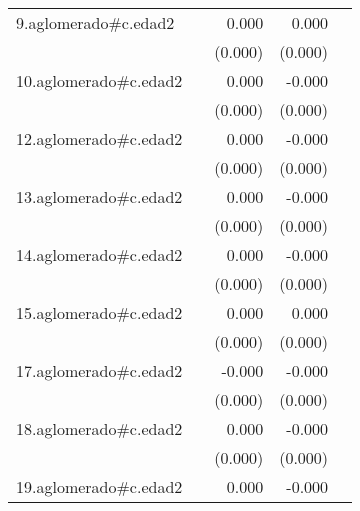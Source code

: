 {\begin{longtable}{l*{4}{D{.}{.}{-1}}}
\addlinespace
9.aglomerado#c.edad2&                     &       0.000\sym{*}  &       0.000         &                     \\
            &                     &     (0.000)         &     (0.000)         &                     \\
\addlinespace
10.aglomerado#c.edad2&                     &       0.000         &      -0.000\sym{**} &                     \\
            &                     &     (0.000)         &     (0.000)         &                     \\
\addlinespace
12.aglomerado#c.edad2&                     &       0.000         &      -0.000         &                     \\
            &                     &     (0.000)         &     (0.000)         &                     \\
\addlinespace
13.aglomerado#c.edad2&                     &       0.000\sym{*}  &      -0.000         &                     \\
            &                     &     (0.000)         &     (0.000)         &                     \\
\addlinespace
14.aglomerado#c.edad2&                     &       0.000         &      -0.000         &                     \\
            &                     &     (0.000)         &     (0.000)         &                     \\
\addlinespace
15.aglomerado#c.edad2&                     &       0.000\sym{**} &       0.000         &                     \\
            &                     &     (0.000)         &     (0.000)         &                     \\
\addlinespace
17.aglomerado#c.edad2&                     &      -0.000         &      -0.000\sym{**} &                     \\
            &                     &     (0.000)         &     (0.000)         &                     \\
\addlinespace
18.aglomerado#c.edad2&                     &       0.000\sym{*}  &      -0.000         &                     \\
            &                     &     (0.000)         &     (0.000)         &                     \\
\addlinespace
19.aglomerado#c.edad2&                     &       0.000         &      -0.000         &                     \\

\end{longtable}}
